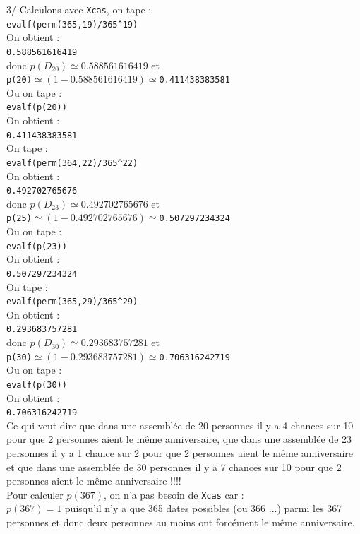 \documentclass[a4paper,11pt]{book}
\begin{document}
3/ Calculons avec {\tt Xcas}, on tape :\\
{\tt evalf(perm(365,19)/365\verb|^|19)}\\
 On obtient :\\
{\tt 0.588561616419}\\
donc $p(D_{20})\simeq 0.588561616419$ et \\
{\tt p(20)}$\simeq (1-0.588561616419) \simeq ${\tt 0.411438383581}\\
Ou on tape :\\
{\tt evalf(p(20))}\\
On obtient :\\
{\tt 0.411438383581}\\
On tape :\\
{\tt evalf(perm(364,22)/365\verb|^|22)}\\
On obtient :\\
{\tt 0.492702765676}\\
donc $p(D_{23})\simeq 0.492702765676$ et\\ 
{\tt p(25)}$\simeq (1-0.492702765676) \simeq ${\tt0.507297234324}\\
Ou on tape :\\
{\tt evalf(p(23))}\\
On obtient :\\
{\tt 0.507297234324}\\
On tape :\\
{\tt evalf(perm(365,29)/365\verb|^|29)}\\
On obtient :\\
{\tt 0.293683757281}\\
donc $p(D_{30})\simeq 0.293683757281$ et\\ 
{\tt p(30)}$\simeq (1-0.293683757281) \simeq ${\tt0.706316242719}\\
Ou on tape :\\
{\tt evalf(p(30))}\\
On obtient :\\
{\tt 0.706316242719}\\
Ce qui veut dire que dans une assembl\'ee de 
20 personnes il y a 4 chances sur 10 pour que 2 personnes aient le m\^eme 
anniversaire, que dans une assembl\'ee de 23 personnes il y a 1 chance sur 
2 pour que 2 personnes aient le m\^eme anniversaire et que dans une 
assembl\'ee de 30 personnes il y a 7 chances sur 
10 pour que 2 personnes aient le m\^eme anniversaire !!!!\\
Pour calculer $p(367)$, on n'a pas besoin de {\tt Xcas} car :\\
 $p(367)=1$ puisqu'il n'y a que 365 dates possibles (ou 366 ...) parmi
les 367 personnes et donc deux  personnes au moins ont forc\'ement le m\^eme 
anniversaire.
\end{document}
